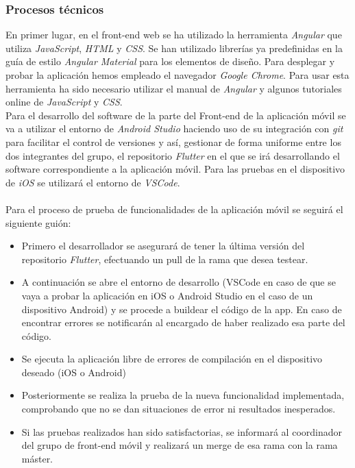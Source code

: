 \documentclass{article}
\begin{document}
\subsubsection{Procesos técnicos}
En primer lugar, en el front-end web se ha utilizado la herramienta \textit{Angular} que utiliza \textit{JavaScript}, \textit{HTML} y \textit{CSS}. Se han utilizado librerías ya predefinidas en la guía de estilo \textit{Angular Material} para los elementos de diseño. Para desplegar y probar la aplicación hemos empleado el navegador \textit{Google Chrome}.
Para usar esta herramienta ha sido necesario utilizar el manual de \textit{Angular} y algunos tutoriales online de \textit{JavaScript} y \textit{CSS}.\\
\hfill \break
Para el desarrollo del software de la parte del Front-end de la aplicación móvil se va a utilizar el entorno de \textit{Android Studio} haciendo uso de su integración con \textit{git} para facilitar el control de versiones y así, gestionar de forma uniforme entre los dos integrantes del grupo, el repositorio \textit{Flutter} en el que se irá desarrollando el software correspondiente a la aplicación móvil. Para las pruebas en el dispositivo de \textit{iOS} se utilizará el entorno de \textit{VSCode}.\\\\
Para el proceso de prueba de funcionalidades de la aplicación móvil se seguirá el siguiente guión:
	\begin{itemize}
		\item Primero el desarrollador se asegurará de tener la última versión del repositorio \textit{Flutter}, efectuando un pull de la rama que desea testear.
		
		\item A continuación se abre el entorno de desarrollo (VSCode en caso de que se vaya a probar la aplicación en iOS o Android Studio en el caso de un dispositivo Android) y se procede a buildear el código de la app. En caso de encontrar errores se notificarán al encargado de haber realizado esa parte del código.
		
		\item Se ejecuta la aplicación libre de errores de compilación en el dispositivo deseado (iOS o Android)
		
		\item Posteriormente se realiza la prueba de la nueva funcionalidad implementada, comprobando que no se dan situaciones de error ni resultados inesperados.
		
		\item Si las pruebas realizados han sido satisfactorias, se informará al coordinador del grupo de front-end móvil y realizará un merge de esa rama con la rama máster.
	\end{itemize}
\newpage
\end{document}
